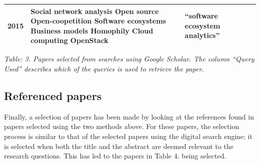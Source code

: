 \documentclass[]{book}
\begin{document}
\begin{longtable}[]{@{}lllll@{}}
\begin{minipage}[t]{0.02\columnwidth}
2015\strut
\end{minipage} & \begin{minipage}[t]{0.34\columnwidth}\raggedright\strut
Social network analysis Open source Open-coopetition Software ecosystems
Business models Homophily Cloud computing OpenStack\strut
\end{minipage} & \begin{minipage}[t]{0.13\columnwidth}\raggedright\strut
``software ecosystem analytics''\strut
\end{minipage}\tabularnewline
\bottomrule
\end{longtable}

\emph{Table: 3. Papers selected from searches using Google Scholar. The
column ``Query Used'' describes which of the queries is used to retrieve
the paper.}

\subsection{Referenced papers}\label{referenced-papers}

Finally, a selection of papers has been made by looking at the
references found in papers selected using the two methods above. For
these papers, the selection process is similar to that of the selected
papers using the digital search engine; it is selected when both the
title and the abstract are deemed relevant to the research questions.
This has led to the papers in Table 4. being selected.
\end{document}
